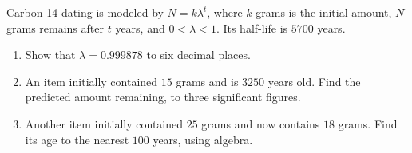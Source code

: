 Carbon-14 dating is modeled by $N=k\lambda^t$, where $k$ grams is the initial amount, $N$ grams remains after $t$ years, and $0<\lambda<1$. Its half-life is $5700$ years.
\begin{enumerate}\item Show that $\lambda=0.999878$ to six decimal places.
\item An item initially contained $15$ grams and is $3250$ years old. Find the predicted amount remaining, to three significant figures.
\item Another item initially contained $25$ grams and now contains $18$ grams. Find its age to the nearest $100$ years, using algebra.\end{enumerate}
